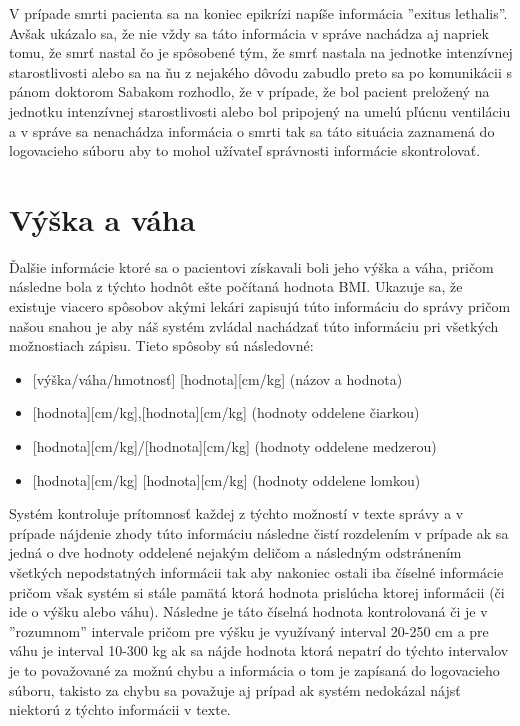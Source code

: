 V prípade smrti pacienta sa na koniec epikrízi napíše informácia ''exitus lethalis''. Avšak ukázalo sa, že nie vždy sa táto informácia v správe nachádza aj napriek tomu, že smrť nastal čo je spôsobené tým, že smrť nastala na jednotke intenzívnej starostlivosti alebo sa na ňu z nejakého dôvodu zabudlo preto sa po komunikácii s pánom doktorom Sabakom rozhodlo, že v prípade, že bol pacient preložený na jednotku intenzívnej starostlivosti alebo bol pripojený na umelú pľúcnu ventiláciu a v správe sa nenachádza informácia o smrti tak sa táto situácia zaznamená do logovacieho súboru aby to mohol užívateľ správnosti informácie skontrolovať.

\section{Výška a váha}

Ďalšie informácie ktoré sa o pacientovi získavali boli jeho výška a váha, pričom následne bola z týchto hodnôt ešte počítaná hodnota BMI. Ukazuje sa, že existuje viacero spôsobov akými lekári zapisujú túto informáciu do správy pričom našou snahou je aby náš systém zvládal nachádzať túto informáciu pri všetkých možnostiach zápisu. Tieto spôsoby sú následovné:

\begin{itemize}
	\item {[výška/váha/hmotnosť]} {[hodnota]}{[cm/kg]} (názov a hodnota)
	\item {[hodnota]}{[cm/kg]},{[hodnota]}{[cm/kg]} (hodnoty oddelene čiarkou)
	\item {[hodnota]}{[cm/kg]}/{[hodnota]}{[cm/kg]} (hodnoty oddelene medzerou)
	\item {[hodnota]}{[cm/kg]} {[hodnota]}{[cm/kg]} (hodnoty oddelene lomkou)
\end{itemize}   

Systém kontroluje prítomnosť každej z týchto možností v texte správy a v prípade nájdenie zhody túto informáciu následne čistí rozdelením v prípade ak sa jedná o dve hodnoty oddelené nejakým deličom a následným odstránením všetkých nepodstatných informácii tak aby nakoniec ostali iba číselné informácie pričom však systém si stále pamätá ktorá hodnota prislúcha ktorej informácii (či ide o výšku alebo váhu). Následne je táto číselná hodnota kontrolovaná či je v ''rozumnom'' intervale pričom pre výšku je využívaný interval 20-250 cm a pre váhu je interval 10-300 kg ak sa nájde hodnota ktorá nepatrí do týchto intervalov je to považované za možnú chybu a informácia o tom je zapísaná do logovacieho súboru, takisto za chybu sa považuje aj prípad ak systém nedokázal nájsť niektorú z týchto informácii v texte.

